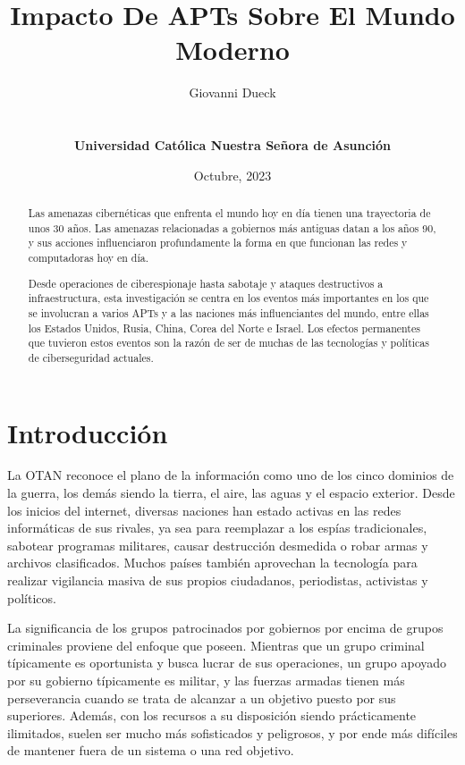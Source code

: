 \documentclass{article}
\title{Impacto De APTs Sobre El Mundo Moderno}
\author{Giovanni Dueck\\\UrlFont{giodueck@gmail.com}\\\\{\bf Universidad Católica Nuestra Señora de Asunción}}
\date{Octubre, 2023}
\begin{document}
\maketitle

\begin{abstract}

Las amenazas cibernéticas que enfrenta el mundo hoy en día tienen una trayectoria de unos 30 años. Las amenazas relacionadas a gobiernos más antiguas datan a los años 90, y sus acciones influenciaron profundamente la forma en que funcionan las redes y computadoras hoy en día.

Desde operaciones de ciberespionaje hasta sabotaje y ataques destructivos a infraestructura, esta investigación se centra en los eventos más importantes en los que se involucran a varios APTs y a las naciones más influenciantes del mundo, entre ellas los Estados Unidos, Rusia, China, Corea del Norte e Israel. Los efectos permanentes que tuvieron estos eventos son la razón de ser de muchas de las tecnologías y políticas de ciberseguridad actuales.

\end{abstract}

\section{Introducción}
La OTAN reconoce el plano de la información como uno de los cinco dominios de la guerra, los demás siendo la tierra, el aire, las aguas y el espacio exterior. Desde los inicios del internet, diversas naciones han estado activas en las redes informáticas de sus rivales, ya sea para reemplazar a los espías tradicionales, sabotear programas militares, causar destrucción desmedida o robar armas y archivos clasificados. Muchos países también aprovechan la tecnología para realizar vigilancia masiva de sus propios ciudadanos, periodistas, activistas y políticos.

La significancia de los grupos patrocinados por gobiernos por encima de grupos criminales proviene del enfoque que poseen. Mientras que un grupo criminal típicamente es oportunista y busca lucrar de sus operaciones, un grupo apoyado por su gobierno típicamente es militar, y las fuerzas armadas tienen más perseverancia cuando se trata de alcanzar a un objetivo puesto por sus superiores. Además, con los recursos a su disposición siendo prácticamente ilimitados, suelen ser mucho más sofisticados y peligrosos, y por ende más difíciles de mantener fuera de un sistema o una red objetivo.
\end{document}
